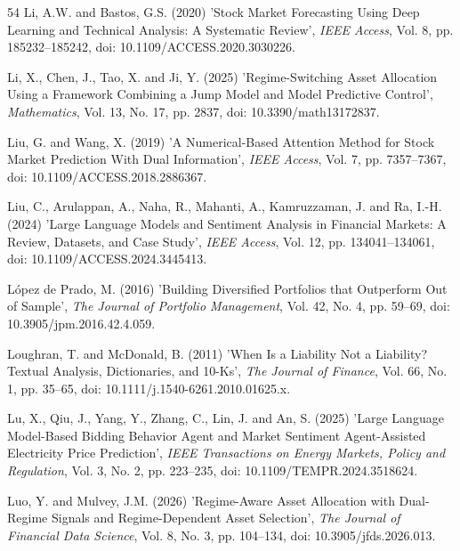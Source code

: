 \documentclass{singlecol-new}
\theoremstyle{TH}{
\newtheorem{lemma}{Lemma}
\newtheorem{theorem}[lemma]{Theorem}
\newtheorem{corrolary}[lemma]{Corrolary}
\newtheorem{conjecture}[lemma]{Conjecture}
\newtheorem{proposition}[lemma]{Proposition}
\newtheorem{claim}[lemma]{Claim}
\newtheorem{stheorem}[lemma]{Wrong Theorem}
\newtheorem{algorithm}{Algorithm}
}
\theoremstyle{THrm}{
\newtheorem{definition}{Definition}[section]
\newtheorem{question}{Question}[section]
\newtheorem{remark}{Remark}
\newtheorem{scheme}{Scheme}
}
\theoremstyle{THhit}{
\newtheorem{case}{Case}[section]
}
\begin{document}
\begin{thebibliography}{54}
Li, A.W. and Bastos, G.S. (2020) 'Stock Market Forecasting Using Deep Learning and Technical Analysis: A Systematic Review', {\it IEEE Access}, Vol. 8, pp. 185232--185242, doi: 10.1109/ACCESS.2020.3030226.

Li, X., Chen, J., Tao, X. and Ji, Y. (2025) 'Regime-Switching Asset Allocation Using a Framework Combining a Jump Model and Model Predictive Control', {\it Mathematics}, Vol. 13, No. 17, pp. 2837, doi: 10.3390/math13172837.

Liu, G. and Wang, X. (2019) 'A Numerical-Based Attention Method for Stock Market Prediction With Dual Information', {\it IEEE Access}, Vol. 7, pp. 7357--7367, doi: 10.1109/ACCESS.2018.2886367.

Liu, C., Arulappan, A., Naha, R., Mahanti, A., Kamruzzaman, J. and Ra, I.-H. (2024) 'Large Language Models and Sentiment Analysis in Financial Markets: A Review, Datasets, and Case Study', {\it IEEE Access}, Vol. 12, pp. 134041--134061, doi: 10.1109/ACCESS.2024.3445413.

L\'opez de Prado, M. (2016) 'Building Diversified Portfolios that Outperform Out of Sample', {\it The Journal of Portfolio Management}, Vol. 42, No. 4, pp. 59--69, doi: 10.3905/jpm.2016.42.4.059.

Loughran, T. and McDonald, B. (2011) 'When Is a Liability Not a Liability? Textual Analysis, Dictionaries, and 10-Ks', {\it The Journal of Finance}, Vol. 66, No. 1, pp. 35--65, doi: 10.1111/j.1540-6261.2010.01625.x.

Lu, X., Qiu, J., Yang, Y., Zhang, C., Lin, J. and An, S. (2025) 'Large Language Model-Based Bidding Behavior Agent and Market Sentiment Agent-Assisted Electricity Price Prediction', {\it IEEE Transactions on Energy Markets, Policy and Regulation}, Vol. 3, No. 2, pp. 223--235, doi: 10.1109/TEMPR.2024.3518624.

Luo, Y. and Mulvey, J.M. (2026) 'Regime-Aware Asset Allocation with Dual-Regime Signals and Regime-Dependent Asset Selection', {\it The Journal of Financial Data Science}, Vol. 8, No. 3, pp. 104--134, doi: 10.3905/jfds.2026.013.


\end{thebibliography}
\end{document}
